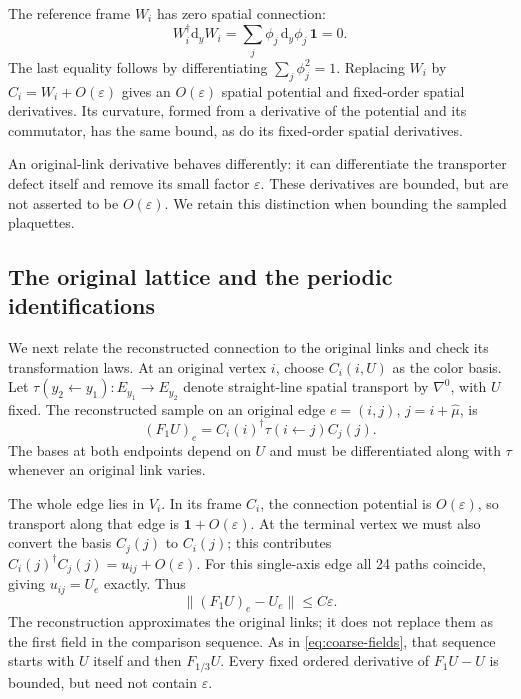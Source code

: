 \documentclass[11pt,a4paper]{article}
\theoremstyle{remark}
\newcommand{\Id}{\mathbf 1}
\newcommand{\dd}{\mathrm d}
\newcommand{\eps}{\varepsilon}
\begin{document}
The reference frame $W_i$ has zero spatial connection:
\begin{equation}
 W_i^{\dagger}\dd_yW_i
    =\sum_j\phi_j\,\dd_y\phi_j\,\Id=0.
\end{equation}
The last equality follows by differentiating $\sum_j\phi_j^2=1$.
Replacing $W_i$ by $C_i=W_i+O(\eps)$ gives an $O(\eps)$ spatial
potential and fixed-order spatial derivatives. Its curvature, formed
from a derivative of the potential and its commutator, has the same
bound, as do its fixed-order spatial derivatives.

An original-link derivative behaves differently: it can differentiate
the transporter defect itself and remove its small factor $\eps$.
These derivatives are bounded, but are not asserted to be $O(\eps)$.
We retain this distinction when bounding the sampled plaquettes.

\subsection{The original lattice and the periodic identifications}
\label{app:g:edges}

We next relate the reconstructed connection to the original links and
check its transformation laws. At an original vertex $i$, choose
$C_i(i,U)$ as the color basis. Let
$\tau(y_2\leftarrow y_1):E_{y_1}\to E_{y_2}$ denote straight-line
spatial transport by $\nabla^0$, with $U$ fixed. The reconstructed
sample on an original edge $e=(i,j)$, $j=i+\hat\mu$, is
\begin{equation}
 (F_1U)_e=C_i(i)^{\dagger}\tau(i\leftarrow j)C_j(j).
\end{equation}
The bases at both endpoints depend on $U$ and must be differentiated
along with $\tau$ whenever an original link varies.

The whole edge lies in $V_i$. In its frame $C_i$, the connection
potential is $O(\eps)$, so transport along that edge is
$\Id+O(\eps)$. At the terminal vertex we must also convert the
basis $C_j(j)$ to $C_i(j)$; this contributes
$C_i(j)^\dagger C_j(j)=u_{ij}+O(\eps)$. For this single-axis edge
all 24 paths coincide, giving $u_{ij}=U_e$ exactly. Thus
\begin{equation}
 \|(F_1U)_e-U_e\|\le C\eps .
 \label{app:g:root-consistency}
\end{equation}
The reconstruction approximates the original links; it does not replace
them as the first field in the comparison sequence. As in
\eqref{eq:coarse-fields}, that sequence starts with $U$ itself and
then $F_{1/3}U$. Every fixed ordered derivative of $F_1U-U$ is
bounded, but need not contain $\eps$.
\end{document}
